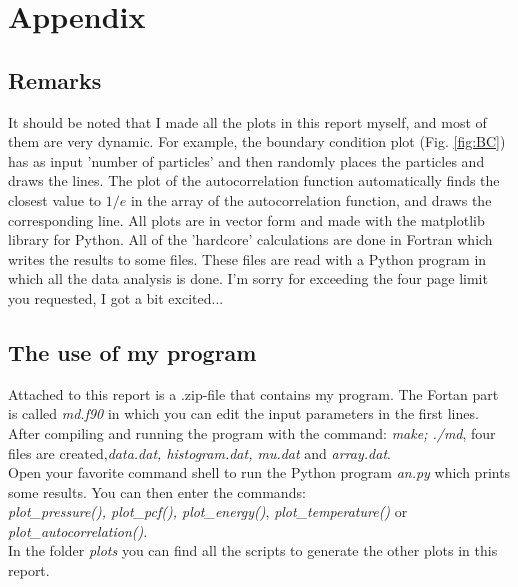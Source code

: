 \documentclass{article}
\begin{document}

\section{Appendix}
\subsection{Remarks}
It should be noted that I made all the plots in this report myself, and most of them are very dynamic. For example, the boundary condition plot (Fig. \ref{fig:BC}) has as input 'number of particles' and then randomly places the particles and draws the lines. The plot of the autocorrelation function automatically finds the closest value to $1/e$ in the array of the autocorrelation function, and draws the corresponding line. All plots are in vector form and made with the matplotlib library for Python. All of the 'hardcore' calculations are done in Fortran which writes the results to some files. These files are read with a Python program in which all the data analysis is done. I'm sorry for exceeding the four page limit you requested, I got a bit excited...

\subsection{The use of my program}
Attached to this report is a .zip-file that contains my program. The Fortan part is called \emph{md.f90} in which you can edit the input parameters in the first lines. After compiling and running the program with the command: \emph{make; ./md}, four files are created,\emph{data.dat, histogram.dat, mu.dat} and \emph{array.dat}.\\

Open your favorite command shell to run the Python program \emph{an.py} which prints some results. You can then enter the commands:\\ \emph{plot\_pressure(), plot\_pcf(), plot\_energy()}, \emph{plot\_temperature()} or \emph{plot\_autocorrelation()}.\\

In the folder \emph{plots} you can find all the scripts to generate the other plots in this report.
\end{document}
